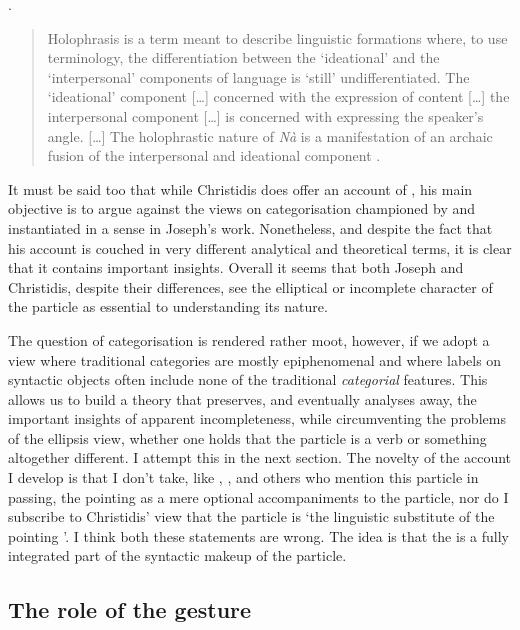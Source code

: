 \documentclass[output=paper]{LSP/langsci}
\begin{document}
\Lsciex.
\begin{quote}
  Holophrasis is a term meant to describe linguistic formations where, to use  terminology, the differentiation between the `ideational' and the `interpersonal' components of language is `still' undifferentiated.  The `ideational' component [\ldots] concerned with the expression of content [\ldots] the interpersonal component [\ldots] is concerned with expressing the speaker's angle. [\ldots] The holophrastic nature of \textit{N\`{a}} is a manifestation of an archaic fusion of the interpersonal and ideational component \citep[67]{christidis:90}. 
\end{quote}

It must be said too that while Christidis does offer an account of \na, his main objective is to argue against the views on categorisation championed by \citet{zwicky:85a} and instantiated in a sense in Joseph's work. 
Nonetheless, and despite the fact that his account is couched in very different analytical and theoretical terms, it is clear  that it contains important insights.  Overall it seems that both Joseph and Christidis, despite their differences, see the elliptical or incomplete character of the particle as essential to understanding its nature.  

The {question} of categorisation is rendered rather moot, however, if we adopt a view where traditional categories are mostly epiphenomenal and where  labels on syntactic objects often include none of the traditional \textit{categorial} features.  This  allows us to build a theory that preserves, and eventually analyses away, the important insights of apparent incompleteness, while circumventing the problems of the ellipsis view, whether one holds that the particle is a verb or something altogether different.  I attempt this in the next section. The novelty of the account I develop is that I don't take, like \citet{joseph:81}, \citet{christidis:90}, and others who mention this particle in passing, the pointing  as a mere optional accompaniments to the particle, nor do I subscribe to Christidis' view that the particle is `the linguistic substitute of the pointing '. I  think both these statements are wrong.  The idea is that the  is a fully integrated part of the syntactic makeup of the particle. 

\subsection{The role of the gesture \xspace\Pointinghand}
\label{sec:gesture}
\end{document}
